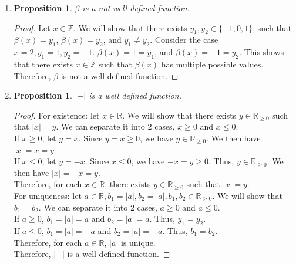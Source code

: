 \documentclass{article}
\newtheorem{prop}[thm]{Proposition}
\begin{document}
\begin{enumerate}
\begin{enumerate}
    \item \begin{prop}
    $\beta$ is a not well defined function.
    \end{prop}
    \begin{proof}
    Let $x \in \mathbb{Z}$. We will show that there exists $y_1, y_2 \in \{-1, 0, 1\}$, such that $\beta(x) = y_1$, $\beta(x) = y_2$, and $y_1 \neq y_2$. Consider the case $x = 2, y_1 = 1, y_2 = -1$. $\beta(x) = 1 = y_1$, and $\beta(x) = -1 = y_2$. This shows that there exists $x \in \mathbb{Z}$ such that $\beta(x)$ has multiple possible values.
    Therefore, $\beta$ is not a well defined function.
    \end{proof}
    
    \item \begin{prop}
    $|-|$ is a well defined function.
    \end{prop}
    \begin{proof}
    For existence: let $x \in \mathbb{R}$. We will show that there exists $y \in \mathbb{R}_{\geq 0}$ such that $|x| = y$. We can separate it into 2 cases, $x \geq 0$ and $x \leq 0$. \\
    
    If $x \geq 0$, let $y = x$. Since $y = x \geq 0$, we have $y \in \mathbb{R}_{\geq 0}$. We then have $|x| = x = y$. \\
    If $x \leq 0$, let $y = -x$. Since $x \leq 0$, we have $-x = y \geq 0$. Thus, $y \in \mathbb{R}_{\geq 0}$. We then have $|x| = -x = y$. \\
    
    Therefore, for each $x \in \mathbb{R}$, there exists $y \in \mathbb{R}_{\geq 0}$ such that $|x| = y$. \\
    
    For uniqueness: let $a \in \mathbb{R}, b_1 = |a|, b_2 = |a|, b_1, b_2 \in \mathbb{R}_{\geq 0}$. We will show that $b_1 = b_2$. We can separate it into 2 cases, $a \geq 0$ and $a \leq 0$. \\
    
    If $a \geq 0$, $b_1 = |a| = a$ and $b_2 = |a| = a$. Thus, $y_1 = y_2$. \\
    If $a \leq 0$, $b_1 = |a| = -a$ and $b_2 = |a| = -a$. Thus, $b_1 = b_2$. \\
    
    Therefore, for each $a \in \mathbb{R}$, $|a|$ is unique. \\
    
    Therefore, $|-|$ is a well defined function.
    \end{proof}
    

\end{enumerate}
\end{enumerate}
\end{document}
